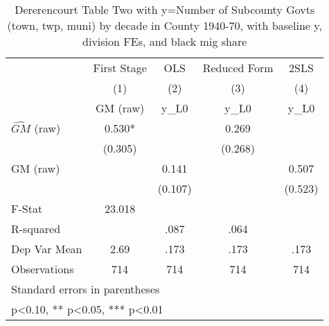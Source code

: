 \begin{table}[htbp]\centering
\def\sym#1{\ifmmode^{#1}\else\(^{#1}\)\fi}
\caption{Dererencourt Table Two with y=Number of Subcounty Govts (town, twp, muni) by decade in County 1940-70, with baseline y, division FEs, and black mig share}
\begin{tabular}{l*{4}{c}}
\toprule
                    & First Stage   &         OLS   &Reduced Form   &        2SLS   \\
                    &\multicolumn{1}{c}{(1)}&\multicolumn{1}{c}{(2)}&\multicolumn{1}{c}{(3)}&\multicolumn{1}{c}{(4)}\\
                    &\multicolumn{1}{c}{GM  (raw)}&\multicolumn{1}{c}{y\_L0}&\multicolumn{1}{c}{y\_L0}&\multicolumn{1}{c}{y\_L0}\\
\midrule
$\hat{GM}$ (raw)    &       0.530*  &               &       0.269   &               \\
                    &     (0.305)   &               &     (0.268)   &               \\
\addlinespace
GM  (raw)           &               &       0.141   &               &       0.507   \\
                    &               &     (0.107)   &               &     (0.523)   \\
\midrule
F-Stat              &      23.018   &               &               &               \\
R-squared           &               &        .087   &        .064   &               \\
Dep Var Mean        &        2.69   &        .173   &        .173   &        .173   \\
Observations        &         714   &         714   &         714   &         714   \\
\bottomrule
\multicolumn{5}{l}{\footnotesize Standard errors in parentheses}\\
\multicolumn{5}{l}{\footnotesize * p<0.10, ** p<0.05, *** p<0.01}\\
\end{tabular}
\end{table}

